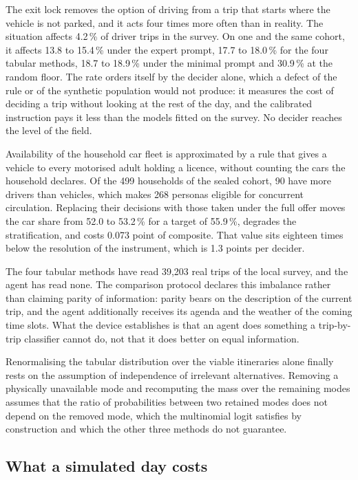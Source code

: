 The exit lock removes the option of driving from a trip that starts where the vehicle is not parked, and it acts four times more often than in reality. The situation affects 4.2\,\% of driver trips in the survey. On one and the same cohort, it affects 13.8 to 15.4\,\% under the expert prompt, 17.7 to 18.0\,\% for the four tabular methods, 18.7 to 18.9\,\% under the minimal prompt and 30.9\,\% at the random floor. The rate orders itself by the decider alone, which a defect of the rule or of the synthetic population would not produce: it measures the cost of deciding a trip without looking at the rest of the day, and the calibrated instruction pays it less than the models fitted on the survey. No decider reaches the level of the field.

Availability of the household car fleet is approximated by a rule that gives a vehicle to every motorised adult holding a licence, without counting the cars the household declares. Of the 499 households of the sealed cohort, 90 have more drivers than vehicles, which makes 268 personas eligible for concurrent circulation. Replacing their decisions with those taken under the full offer moves the car share from 52.0 to 53.2\,\% for a target of 55.9\,\%, degrades the stratification, and costs 0.073 point of composite. That value sits eighteen times below the resolution of the instrument, which is 1.3 points per decider.

The four tabular methods have read 39{,}203 real trips of the local survey, and the agent has read none. The comparison protocol declares this imbalance rather than claiming parity of information: parity bears on the description of the current trip, and the agent additionally receives its agenda and the weather of the coming time slots. What the device establishes is that an agent does something a trip-by-trip classifier cannot do, not that it does better on equal information.

Renormalising the tabular distribution over the viable itineraries alone finally rests on the assumption of independence of irrelevant alternatives. Removing a physically unavailable mode and recomputing the mass over the remaining modes assumes that the ratio of probabilities between two retained modes does not depend on the removed mode, which the multinomial logit satisfies by construction and which the other three methods do not guarantee.

\subsection{What a simulated day costs}
\label{sec:cost}

